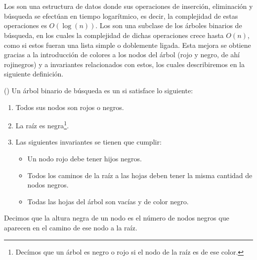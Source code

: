 \section{\Arns}
Los {\arns} son una estructura de datos donde sus operaciones de inserci\'on, eliminaci\'on y
búsqueda se efectúan en tiempo logarítmico, es decir, la complejidad de estas operaciones es
$O(\log(n))$. Los {\arns} son una subclase de los \'arboles binarios de búsqueda, en los cuales la
complejidad de dichas operaciones crece hasta $O(n)$, como si estos fueran una lista simple o
doblemente ligada. Esta mejora se obtiene gracias a la introducción de colores a los nodos del
\'arbol (rojo y negro, de ah\'i rojinegros) y a invariantes relacionados con estos, los
cuales describiremos en la siguiente definici\'on.
\begin{defn}{({\Arns})}
\label{defn_arn}
Un \'arbol binario de búsqueda es un {\arn} si satisface lo siguiente:
\begin{enumerate}
    \item Todos sus nodos son rojos o negros.
    \item La ra\'iz es negra\footnote{Dec\'imos que un \'arbol es negro o rojo si el nodo de la
    ra\'iz es de ese color.}.
    \item Las siguientes invariantes se tienen que cumplir:
    \begin{itemize}
        \item Un nodo rojo debe tener hijos negros.
        \item Todos los caminos de la raíz a las hojas deben tener la misma cantidad de nodos
        negros.
        \item Todas las hojas del \'arbol son vacías y de color negro.
    \end{itemize}
\end{enumerate}
Decimos que la altura negra de un nodo es el n\'umero de nodos negros que aparecen en el camino de 
ese nodo a la raíz.
\end{defn}


